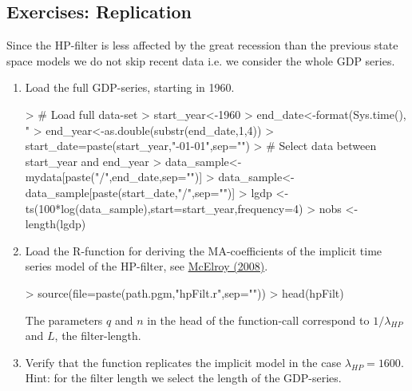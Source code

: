 \documentclass[a4paper]{book}
\begin{document}
\subsection{Exercises: Replication}\label{hp_exe_repli}



Since the HP-filter is less affected by the great recession than the previous state space models we do not skip recent data i.e. we consider the whole GDP series. 
\begin{enumerate}
\item Load the full GDP-series, starting in 1960.
\begin{Schunk}
\begin{Sinput}
> # Load full data-set
> start_year<-1960
> end_date<-format(Sys.time(), "%
> end_year<-as.double(substr(end_date,1,4))
> start_date=paste(start_year,"-01-01",sep="")
> # Select data between start_year and end_year
> data_sample<-mydata[paste("/",end_date,sep="")]
> data_sample<-data_sample[paste(start_date,"/",sep="")]
> lgdp <- ts(100*log(data_sample),start=start_year,frequency=4)
> nobs <- length(lgdp)
\end{Sinput}
\end{Schunk}
\item Load the R-function for deriving the MA-coefficients of the implicit time series model of the HP-filter, see \href{https://www.dropbox.com/s/s8zb0buqzygefby/mcelroy_hp.pdf?dl=0}{McElroy (2008)}.
\begin{Schunk}
\begin{Sinput}
> source(file=paste(path.pgm,"hpFilt.r",sep=""))
> head(hpFilt)
\end{Sinput}
\begin{Soutput}
1 function (q, n)                                                  
2 {                                                                
3     absZ <- (sqrt(q) + sqrt(q + 16) + sqrt(2 * q + 2 * sqrt(q) * 
4         sqrt(q + 16)))/4                                         
5     c <- q/(absZ^2)                                              
6     theta <- atan(sqrt(2 * q + 2 * sqrt(q) * sqrt(q + 16))/4)    
\end{Soutput}
\end{Schunk}
The parameters $q$ and $n$ in the head of the function-call correspond to $1/\lambda_{HP}$ and $L$, the filter-length.
\item \label{exe_hpcode_tuck}Verify that the function replicates the implicit model in the case $\lambda_{HP}=1600$. Hint: for the filter length we select the length of the GDP-series.

\end{enumerate}
\end{document}
